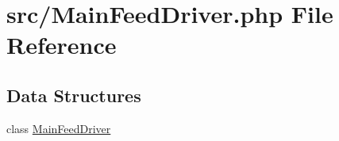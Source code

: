 \hypertarget{_main_feed_driver_8php}{}\section{src/\+Main\+Feed\+Driver.php File Reference}
\label{_main_feed_driver_8php}
\subsection*{Data Structures}
\begin{DoxyCompactItemize}
\item 
class \hyperlink{class_main_feed_driver}{Main\+Feed\+Driver}
\end{DoxyCompactItemize}
